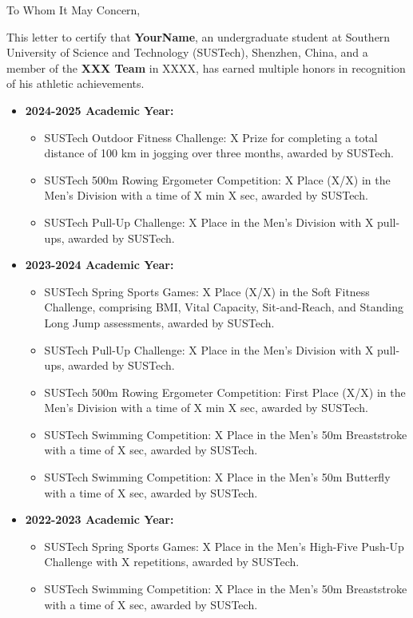\documentclass{letter}
\begin{document}
\begin{letter}{}
    \opening{To Whom It May Concern,}

    This letter to certify that \textbf{YourName}, an undergraduate student at Southern University of Science and Technology (SUSTech), Shenzhen, China, and a member of the \textbf{XXX Team} in XXXX, has earned multiple honors in recognition of his athletic achievements.

\begin{itemize}
    \item \textbf{2024-2025 Academic Year:}
    \begin{itemize}
        \item SUSTech Outdoor Fitness Challenge: X Prize for completing a total distance of 100 km in jogging over three months, awarded by SUSTech.
        \item SUSTech 500m Rowing Ergometer Competition: X Place (X/X) in the Men's Division with a time of X min X sec, awarded by SUSTech.
        \item SUSTech Pull-Up Challenge: X Place in the Men's Division with X pull-ups, awarded by SUSTech.
    \end{itemize}
    
    \item \textbf{2023-2024 Academic Year:}
    \begin{itemize}
        \item SUSTech Spring Sports Games: X Place (X/X) in the Soft Fitness Challenge, comprising BMI, Vital Capacity, Sit-and-Reach, and Standing Long Jump assessments, awarded by SUSTech.
        \item SUSTech Pull-Up Challenge: X Place in the Men's Division with X pull-ups, awarded by SUSTech.
        \item SUSTech 500m Rowing Ergometer Competition: First Place (X/X) in the Men's Division with a time of X min X sec, awarded by SUSTech.
        \item SUSTech Swimming Competition: X Place in the Men's 50m Breaststroke with a time of X sec, awarded by SUSTech.

        \item SUSTech Swimming Competition: X Place in the Men's 50m Butterfly with a time of X sec, awarded by SUSTech.
    \end{itemize}
    
    \item \textbf{2022-2023 Academic Year:}
    \begin{itemize}
        \item SUSTech Spring Sports Games: X Place in the Men's High-Five Push-Up Challenge with X repetitions, awarded by SUSTech.
        \item SUSTech Swimming Competition: X Place in the Men's 50m Breaststroke with a time of X sec, awarded by SUSTech.
    \end{itemize}
\end{itemize}


\end{letter}
\end{document}
